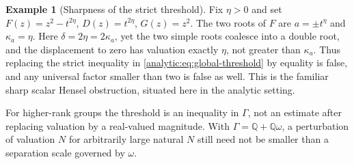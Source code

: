 \documentclass[11pt,letterpaper]{article}
\theoremstyle{definition}
\newtheorem{example}[theorem]{Example}
\theoremstyle{remark}
\newcommand{\Q}{\mathbb Q}
\numberwithin{equation}{section}
\begin{document}
\begin{example}[Sharpness of the strict threshold]
\label{analytic:ex:sharpness}
Fix $\eta>0$ and set $F(z)=z^2-t^{2\eta}$, $D(z)=t^{2\eta}$, $G(z)=z^2$.
The two roots of $F$ are $a=\pm t^\eta$ and $\kappa_a=\eta$. Here
$\delta=2\eta=2\kappa_a$, yet the two simple roots coalesce into a double
root, and the displacement to zero has valuation exactly $\eta$, not greater
than $\kappa_a$. Thus replacing the strict inequality in
\eqref{analytic:eq:global-threshold} by equality is false, and any universal
factor smaller than two is false as well. This is the familiar sharp scalar
Hensel obstruction, situated here in the analytic setting.
\end{example}

For higher-rank groups the threshold is an inequality in $\Gamma$, not an
estimate after replacing valuation by a real-valued magnitude. With
$\Gamma=\Q+\Q\omega$, a perturbation of valuation $N$ for arbitrarily large
natural $N$ still need not be smaller than a separation scale governed by
$\omega$.
\end{document}
